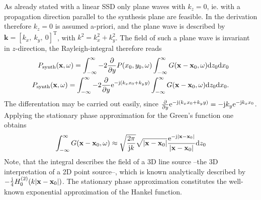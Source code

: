 As already stated with a linear SSD only plane waves with $k_z = 0$, ie. with a propagation direction parallel to the synthesis plane are feasible. In the derivation therefore $k_z = 0$ is assumed a-priori, and the plane wave is described by $\mathbf{k} = [k_x,\ k_y,\ 0]^{\mathrm{T}}$, with $k^2 = k_x^2 + k_y^2$. The field of such a plane wave is invariant in $z$-direction, the Rayleigh-integral therefore reads
\begin{eqnarray}
P_{\mathrm{synth}}(\mathbf{x},\omega) = \int_{-\infty}^{\infty} -2\frac{\partial}{\partial y} P(x_0,y_0,\omega) \int_{-\infty}^{\infty} G(\mathbf{x}-\mathbf{x}_0,\omega) \mathrm{d} z_0 \mathrm{d} x_0 \\
P_{\mathrm{synth}}(\mathbf{x},\omega) = \int_{-\infty}^{\infty} -2\frac{\partial}{\partial y} \mathrm{e}^{-\mathrm{j} \left( k_x x_0 + k_y y \right) } \int_{-\infty}^{\infty} G(\mathbf{x}-\mathbf{x}_0,\omega) \mathrm{d} z_0 \mathrm{d} x_0 .
\end{eqnarray}
The differentation may be carried out easily, since $\frac{\partial}{\partial y} \mathrm{e}^{-\mathrm{j} \left( k_x x_0 + k_y y \right) } = -\mathrm{j} k_y \mathrm{e}^{-\mathrm{j} k_x x_0}$. Applying the stationary phase approximation for the Green's function one obtains
\begin{equation}
\int_{-\infty}^{\infty} G(\mathbf{x}-\mathbf{x}_0,\omega)
\approx \sqrt{\frac{2\pi}{ \mathrm{j} k }} \sqrt{|\mathbf{x} - \mathbf{x}_0|} \frac{\mathrm{e}^{-\mathrm{j} |\mathbf{x}- \mathbf{x}_0|}}{|\mathbf{x}- \mathbf{x}_0|}
 \mathrm{d} z_0
\end{equation}
Note, that the integral describes the field of a 3D line source --the 3D interpretation of a 2D point source--, which is known analytically described by $-\frac{\mathrm{j}}{4} H_0^{(2)}(k|\mathbf{x} - \mathbf{x}_0|)$. The stationary phase approximation constitutes the well-known exponential approximation of the Hankel function.

